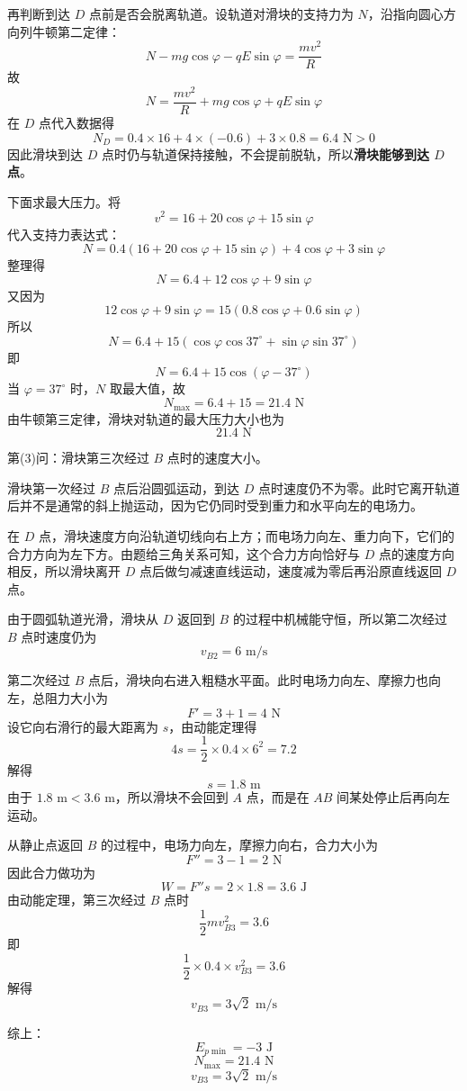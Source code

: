 \documentclass[CJKmath,10pt,a4paper]{exam-zh}
\begin{document}
\begin{question}
\begin{solution}
再判断到达 $D$ 点前是否会脱离轨道。设轨道对滑块的支持力为 $N$，沿指向圆心方向列牛顿第二定律：
\[
N-mg\cos\varphi-qE\sin\varphi=\frac{mv^2}{R}
\]
故
\[
N=\frac{mv^2}{R}+mg\cos\varphi+qE\sin\varphi
\]
在 $D$ 点代入数据得
\[
N_D=0.4\times 16+4\times(-0.6)+3\times 0.8=6.4\text{ N}>0
\]
因此滑块到达 $D$ 点时仍与轨道保持接触，不会提前脱轨，所以\textbf{滑块能够到达 $D$ 点}。\par

下面求最大压力。将
\[
v^2=16+20\cos\varphi+15\sin\varphi
\]
代入支持力表达式：
\[
N=0.4(16+20\cos\varphi+15\sin\varphi)+4\cos\varphi+3\sin\varphi
\]
整理得
\[
N=6.4+12\cos\varphi+9\sin\varphi
\]
又因为
\[
12\cos\varphi+9\sin\varphi=15(0.8\cos\varphi+0.6\sin\varphi)
\]
所以
\[
N=6.4+15(\cos\varphi\cos37^\circ+\sin\varphi\sin37^\circ)
\]
即
\[
N=6.4+15\cos(\varphi-37^\circ)
\]
当 $\varphi=37^\circ$ 时，$N$ 取最大值，故
\[
N_{\max}=6.4+15=21.4\text{ N}
\]
由牛顿第三定律，滑块对轨道的最大压力大小也为
\[
21.4\text{ N}
\]

第(3)问：滑块第三次经过 $B$ 点时的速度大小。\par
滑块第一次经过 $B$ 点后沿圆弧运动，到达 $D$ 点时速度仍不为零。此时它离开轨道后并不是通常的斜上抛运动，因为它仍同时受到重力和水平向左的电场力。\par
在 $D$ 点，滑块速度方向沿轨道切线向右上方；而电场力向左、重力向下，它们的合力方向为左下方。由题给三角关系可知，这个合力方向恰好与 $D$ 点的速度方向相反，所以滑块离开 $D$ 点后做匀减速直线运动，速度减为零后再沿原直线返回 $D$ 点。\par
由于圆弧轨道光滑，滑块从 $D$ 返回到 $B$ 的过程中机械能守恒，所以第二次经过 $B$ 点时速度仍为
\[
v_{B2}=6\text{ m/s}
\]

第二次经过 $B$ 点后，滑块向右进入粗糙水平面。此时电场力向左、摩擦力也向左，总阻力大小为
\[
F'=3+1=4\text{ N}
\]
设它向右滑行的最大距离为 $s$，由动能定理得
\[
4s=\frac12\times 0.4\times 6^2=7.2
\]
解得
\[
s=1.8\text{ m}
\]
由于 $1.8\text{ m}<3.6\text{ m}$，所以滑块不会回到 $A$ 点，而是在 $AB$ 间某处停止后再向左运动。\par

从静止点返回 $B$ 的过程中，电场力向左，摩擦力向右，合力大小为
\[
F''=3-1=2\text{ N}
\]
因此合力做功为
\[
W=F''s=2\times 1.8=3.6\text{ J}
\]
由动能定理，第三次经过 $B$ 点时
\[
\frac12 mv_{B3}^2=3.6
\]
即
\[
\frac12\times 0.4\times v_{B3}^2=3.6
\]
解得
\[
v_{B3}=3\sqrt{2}\text{ m/s}
\]

综上：
\[
\boxed{E_{p\min}=-3\text{ J}}
\]
\[
\boxed{N_{\max}=21.4\text{ N}}
\]
\[
\boxed{v_{B3}=3\sqrt{2}\text{ m/s}}
\]
\end{solution}
\end{question}	
\end{document}
